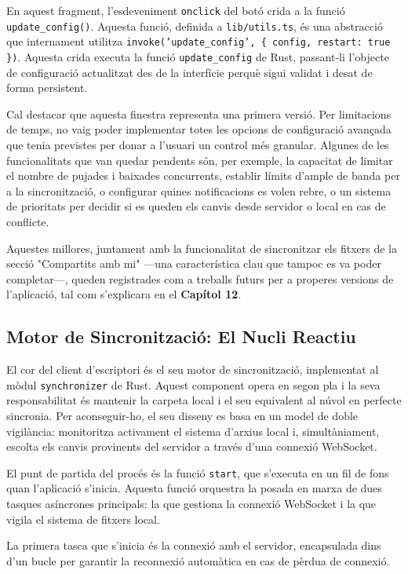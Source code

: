 En aquest fragment, l'esdeveniment \texttt{onclick} del botó crida a la funció \texttt{update\_config()}. Aquesta funció, definida a \texttt{lib/utils.ts}, és una abstracció que internament utilitza \texttt{invoke('update\_config', \{ config, restart: true \})}. Aquesta crida executa la funció \texttt{update\_config} de Rust, passant-li l'objecte de configuració actualitzat des de la interfície perquè sigui validat i desat de forma persistent.

Cal destacar que aquesta finestra representa una primera versió. Per limitacions de temps, no vaig poder implementar totes les opcions de configuració avançada que tenia previstes per donar a l'usuari un control més granular. Algunes de les funcionalitats que van quedar pendents són, per exemple, la capacitat de limitar el nombre de pujades i baixades concurrents, establir límits d'ample de banda per a la sincronització, o configurar quines notificacions es volen rebre, o un sistema de prioritats per decidir si es queden els canvis desde servidor o local en cas de conflicte.

Aquestes millores, juntament amb la funcionalitat de sincronitzar els fitxers de la secció "Compartits amb mi" —una característica clau que tampoc es va poder completar—, queden registrades com a treballs futurs per a properes versions de l'aplicació, tal com s'explicara en el \textbf{Capítol 12}.

\subsection{Motor de Sincronització: El Nucli Reactiu}
El cor del client d'escriptori és el seu motor de sincronització, implementat al mòdul \texttt{synchronizer} de Rust. Aquest component opera en segon pla i la seva responsabilitat és mantenir la carpeta local i el seu equivalent al núvol en perfecte sincronia. Per aconseguir-ho, el seu disseny es basa en un model de doble vigilància: monitoritza activament el sistema d'arxius local i, simultàniament, escolta els canvis provinents del servidor a través d'una connexió WebSocket.

El punt de partida del procés és la funció \texttt{start}, que s'executa en un fil de fons quan l'aplicació s'inicia. Aquesta funció orquestra la posada en marxa de dues tasques asíncrones principals: la que gestiona la connexió WebSocket i la que vigila el sistema de fitxers local.

La primera tasca que s'inicia és la connexió amb el servidor, encapsulada dins d'un bucle per garantir la reconnexió automàtica en cas de pèrdua de connexió.

